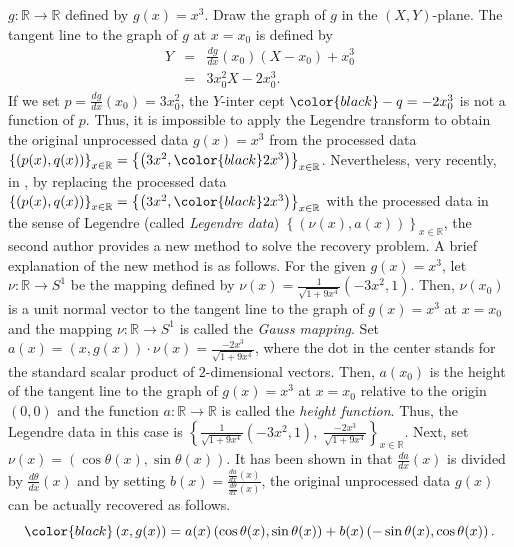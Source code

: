 \documentclass{amsart}
\theoremstyle{definition}
\theoremstyle{definition}
\theoremstyle{definition}
\newcommand{\ch}[1]{{\color{black} #1}}
\begin{document}
$g: \mathbb{R}\to \mathbb{R}$ defined by $g(x)=x^3$.    
Draw the graph of $g$ in the $(X, Y)$-plane.    
The tangent line to the graph of $g$ at $x=x_0$ is defined by 
\begin{eqnarray*}
Y & = & \frac{dg}{dx}\left(x_0\right)\left(X-x_0\right)+x^3_0 \\ 
{ } & = & 3x_0^2X-2x^3_0.   
\end{eqnarray*}      
If we set $p=\frac{dg}{dx}\left(x_0\right)=3x_0^2$, the $Y$-inter\ch{c}ept 
${\color{black}-q}=-2x_0^3$ is not a function of $p$.    
Thus, it is impossible to apply the Legendre transform to obtain the original 
unprocessed data $g(x)=x^3$ from the processed data 
$\left\{(p(x), q(x))\right\}_{x\in \mathbb{R}}=
\left\{\left(3x^2, {\color{black}2x^3}\right)\right\}_{x\in \mathbb{R}}$.     
{\color{black}Nevertheless,} very recently, in \cite{nishimura, nishimura2}, by 
replacing the processed data 
$\left\{(p(x), q(x))\right\}_{x\in \mathbb{R}}=
\left\{\left(3x^2, {\color{black}2x^3}\right)\right\}_{x\in \mathbb{R}}$ 
with the processed data in the sense of Legendre (called \textit{Legendre data}) 
$\left\{\left(\nu(x), a(x)\right)\right\}_{x\in \mathbb{R}}$, 
the second author provides a new method to solve the recovery problem.     
A brief explanation of the new method 
is as follows.   
For the given $g(x)=x^3$, let  
$\nu: \mathbb{R}\to S^1$ be the mapping defined by 
$\nu(x)=\frac{1}{\sqrt{1+9x^4}}\left(-3x^2, 1\right)$.    
Then, $\nu\left(x_0\right)$ is a unit normal vector {\color{black}to} the 
tangent line to the graph of $g(x)=x^3$ at $x=x_0$ and the mapping 
$\nu: \mathbb{R}\to S^1$ is called the \textit{Gauss mapping}.  
Set $a(x)=\left(x, g(x)\right)\cdot \nu(x)=\frac{-2x^3}{\sqrt{1+9x^4}}$, where 
the dot in the center stands for the standard scalar product of 
$2$-dimensional vectors. Then,  $a(x_0)$ is the height of the tangent 
line to the graph of $g(x)=x^3$ at $x=x_0$ relative to the origin $(0,0)$ and 
the function $a: \mathbb{R}\to \mathbb{R}$ is called the 
\textit{height function}.      
Thus, the Legendre data in this case is 
$\left\{\frac{1}{\sqrt{1+9x^4}}\left(-3x^2, 1\right), \; 
\frac{-2x^3}{\sqrt{1+9x^4}}\right\}_{x\in \mathbb{R}}$.    
Next, set $\nu(x)=\left(\cos\theta(x), \sin\theta(x)\right)$.    
It has been shown in \cite{nishimura, nishimura2} that 
$\frac{da}{dx}(x)$ is divided by $\frac{d\theta}{dx}(x)$ and 
by setting $b(x)=\frac{\frac{da}{dx}(x)}{\frac{d\theta}{dx}(x)}$, 
the original unprocessed data $g(x)$ can be actually recovered as follows.   
\[
{\color{black} 
\left(x, g(x)\right)
}
=a(x)\left(\cos\theta(x), \sin\theta(x)\right) + 
b(x)\left(-\sin\theta(x), \cos\theta(x)\right).  
\]  
\end{document}
